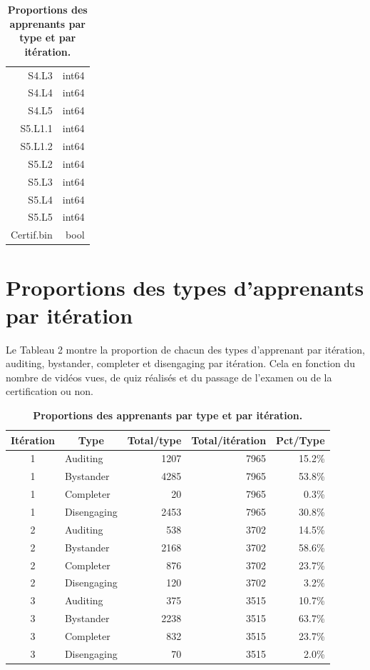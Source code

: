 \documentclass[12pt, a4paper, titlepage, table]{article}
\begin{document}
\begin{table}[H]
\begin{tabular}{|r|r|}
	S4.L3      &            int64 \\ 
	S4.L4      &            int64 \\ 
	S4.L5      &           	int64 \\   
	S5.L1.1    &            int64 \\ 
	S5.L1.2    &            int64 \\ 
	S5.L2      &            int64 \\ 
	S5.L3      &            int64 \\ 
	S5.L4      &            int64 \\ 
	S5.L5      &            int64 \\ 
	Certif.bin &           bool  \\
	\hline
	\end{tabular}
	\caption{\textbf{Proportions des apprenants par type et par itération.}}
\end{table}  

\newpage
\section{Proportions des types d'apprenants par itération}
Le Tableau 2 montre la proportion de chacun des types d'apprenant par itération,  auditing, bystander, completer et disengaging par itération. Cela en fonction du nombre de vidéos vues, de quiz réalisés et du passage de l'examen ou de la certification ou non.

\begin{table}[H]
	\centering
	\fontsize{10}{12}\selectfont
	\begin{tabular}{|c|l|r|r|r|}
		\hline 
		\multicolumn{1}{|c|}{\textbf{Itération}} & 
		\multicolumn{1}{c|}{\textbf{Type}} &
		\multicolumn{1}{c|}{\textbf{Total/type}}&
		\multicolumn{1}{c|}{\textbf{Total/itération}}&
		\multicolumn{1}{c|}{\textbf{Pct/Type}}\\
		\hline
		1&	Auditing&		1207&	7965&	15.2\%\\
		1&	Bystander&		4285&	7965&	53.8\%\\
		1&	Completer&		20	&	7965&	0.3\%\\
		1&	Disengaging&	2453&	7965&	30.8\%\\
		2&	Auditing&		538	&	3702&	14.5\%\\
		2&	Bystander&		2168&	3702&	58.6\%\\
		2&	Completer&		876	&	3702&	23.7\%\\
		2&	Disengaging&	120	&	3702&	3.2\%\\
		3&	Auditing&		375	&	3515&	10.7\%\\
		3&	Bystander&		2238&	3515&	63.7\%\\
		3&	Completer&		832	&	3515&	23.7\%\\
		3&	Disengaging&	70	&	3515&	2.0\%\\
		\hline
	\end{tabular}
\caption{\textbf{Proportions des apprenants par type et par itération.}}
\end{table}
\end{document}
